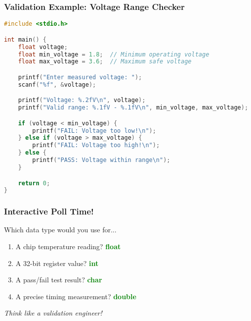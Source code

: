 \documentclass{beamer}
\begin{document}
\begin{frame}[fragile]
\frametitle{Validation Example: Voltage Range Checker}
\begin{lstlisting}[language=C, basicstyle=\tiny]
#include <stdio.h>

int main() {
    float voltage;
    float min_voltage = 1.8;  // Minimum operating voltage
    float max_voltage = 3.6;  // Maximum safe voltage

    printf("Enter measured voltage: ");
    scanf("%f", &voltage);

    printf("Voltage: %.2fV\n", voltage);
    printf("Valid range: %.1fV - %.1fV\n", min_voltage, max_voltage);

    if (voltage < min_voltage) {
        printf("FAIL: Voltage too low!\n");
    } else if (voltage > max_voltage) {
        printf("FAIL: Voltage too high!\n");
    } else {
        printf("PASS: Voltage within range\n");
    }

    return 0;
}
\end{lstlisting}
\end{frame}

\begin{frame}
\frametitle{Interactive Poll Time!}
\begin{center}
\Large Which data type would you use for...
\end{center}

\begin{enumerate}
    \item A chip temperature reading? \pause \textcolor{green}{\textbf{float}}
    \item A 32-bit register value? \pause \textcolor{green}{\textbf{int}}
    \item A pass/fail test result? \pause \textcolor{green}{\textbf{char}}
    \item A precise timing measurement? \pause \textcolor{green}{\textbf{double}}
\end{enumerate}

\vspace{0.5cm}
\begin{center}
\textit{Think like a validation engineer!}
\end{center}
\end{frame}
\end{document}
